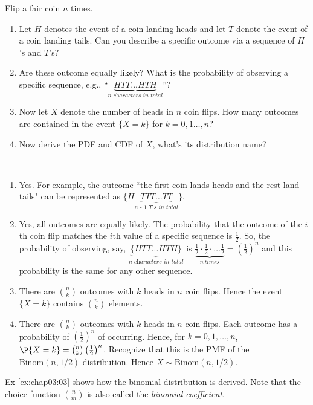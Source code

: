 \begin{exercise}\label{ex:chap03:03}
	Flip a fair coin $n$ times.
	\begin{enumerate}
		\item Let $H$ denotes the event of a coin landing heads and let $T$ denote the event of a coin landing tails. Can you describe a specific outcome via a sequence of $H$'s and $T$'s?
		\item Are these outcome equally likely? What is the probability of observing a specific sequence, e.g., ``$\underbrace{HTT...HTH}_{\textit{n characters in total}}$''?
		\item Now let $X$ denote the number of heads in $n$ coin flips. How many outcomes are contained in the event $\{X=k\}$ for $k = 0, 1 \hdots, n$?
		\item Now derive the PDF and CDF of $X$, what's its distribution name?
	\end{enumerate}
	\begin{solution}~
		\begin{enumerate}
			\item Yes. For example, the outcome ``the first coin lands heads and the rest land tails" can be represented as $\{H\underbrace{TTT \ldots TT}_{\textit{n - 1 T's in total}}\}$.
			\item Yes, all outcomes are equally likely. The probability that the outcome of the $i$th coin flip matches the $i$th value of a specific sequence is $\frac{1}{2}$. So, the probability of observing, say, $\underbrace{\{HTT...HTH\}}_{\textit{n characters in total}}$ is $\underbrace{\frac{1}{2} \cdot \frac{1}{2} \cdot \ldots \frac{1}{2}}_{n \: times} = \left(\frac{1}{2}\right)^n$ and this probability is the same for any other sequence.
			\item There are $\binom{n}{k}$ outcomes with $k$ heads in $n$ coin flips. Hence the event $\{X=k\}$ contains $\binom{n}{k}$ elements.
			\item There are $\binom{n}{k}$ outcomes with $k$ heads in $n$ coin flips. Each outcome has a probability of $\left(\frac{1}{2}\right)^n$ of occurring. Hence, for $k = 0, 1, \hdots, n$, $\P{X = k} = \binom{n}{k} \left(\frac{1}{2}\right)^n$. Recognize that this is the PMF of the $\text{Binom}(n, 1/2)$ distribution. Hence $X \sim \text{Binom}(n, 1/2)$.
		\end{enumerate}
	\end{solution}
\end{exercise}
	
\begin{remark}
	Ex \ref{ex:chap03:03} shows how the binomial distribution is derived. Note that the choice function $\binom{n}{m}$ is also called the \emph{binomial coefficient}. 
\end{remark}

